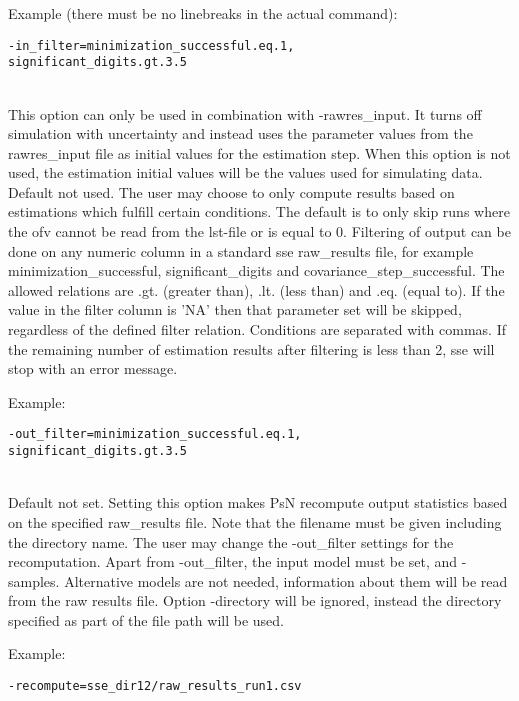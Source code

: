 \begin{optionlist}
Example (there must be no linebreaks in the actual command):
\begin{verbatim}
-in_filter=minimization_successful.eq.1,
significant_digits.gt.3.5
\end{verbatim} \\
\nextopt
{}
This option can only be used in combination with -rawres\_input. It turns off 
simulation with uncertainty and instead uses the parameter values from the 
rawres\_input file as initial values for the estimation step. When this 
option is not used, the estimation initial values will be the values
used for simulating data.
\nextopt
{}
Default not used. The user may choose to only compute results based on estimations which fulfill certain conditions. The default is to only skip runs where the ofv cannot be read from the lst-file or is equal to 0. Filtering of output can be done on any numeric column in a standard sse raw\_results file, for example minimization\_successful, significant\_digits and covariance\_step\_successful. The allowed relations are .gt. (greater than), .lt. (less than) and .eq. (equal to). If the value in the filter column is 'NA' then that parameter set will be skipped, regardless of the defined filter relation. Conditions are separated with commas. If the remaining number of estimation results after filtering is less than 2, sse will stop with an error message.

Example:
\begin{verbatim}
-out_filter=minimization_successful.eq.1,
significant_digits.gt.3.5
\end{verbatim} \\
\nextopt
{}
Default not set. Setting this option makes PsN recompute output statistics based on the specified raw\_results file. Note that the filename must be given including the directory name. The user may change the -out\_filter settings for the recomputation. Apart from -out\_filter, the input model must be set, and -samples. Alternative models are not needed, information about them will be read from the raw results file. Option -directory will be ignored, instead the directory specified as part of the file path will be used.


Example:
\begin{verbatim}
-recompute=sse_dir12/raw_results_run1.csv
\end{verbatim}
\nextopt
\end{optionlist}


